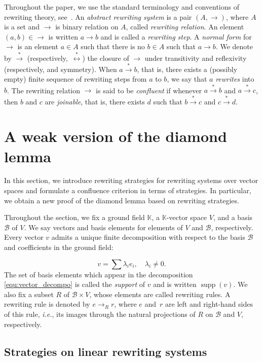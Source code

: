 \documentclass[10pt]{easychair}
\theoremstyle{definition}
\newcommand\ie{\emph{i.e.}}
\DeclareMathOperator{\supp}{supp}
\newcommand\basis{\mathscr{B}}
\newcommand\K{\mathbb{K}}
\newcommand\rewR{\to_R}
\newcommand\rewTrans{\overset{*}{\to}}
\newcommand\rewEquiv{\overset{*}{\leftrightarrow}}
\begin{document}
Throughout the paper, we use the standard terminology and conventions of
rewriting theory, see~\cite{MR1629216}. An {\em abstract rewriting
  system} is a pair $(A,\to)$, where $A$ is a set and $\to$ is binary
relation on $A$, called {\em rewriting relation}. An element
$(a,b)\in\to$ is written $a\to b$ and is called a {\em rewriting step}. A
{\em normal form} for $\to$ is an element $a\in A$ such that there is no
$b\in A$ such that $a\to b$. We denote by $\rewTrans$ 
(respectively,~$\rewEquiv$) the closure of $\to$ under transitivity and
reflexivity (respectively, and symmetry). When $a\rewTrans b$, that is,
there exists a (possibly empty) finite sequence of rewriting steps from
$a$ to  $b$, we say that $a$ {\em rewrites} into $b$. The rewriting
relation $\to$ is said to be {\em confluent} if whenever $a\rewTrans b$
and $a\rewTrans c$, then $b$ and $c$ are {\em joinable}, that is, there
exists $d$ such that $b\rewTrans c$ and $c\rewTrans d$. 


\section{A weak version of the diamond lemma}
\label{sec:a_weak_version_of_the_diamond_lemma}

In this section, we introduce rewriting strategies for rewriting systems
over vector spaces and formulate a confluence criterion in terms of
strategies. In particular, we obtain a new proof of the diamond lemma
based on rewriting strategies.
\medskip

Throughout the section, we fix a ground field $\K$, a $\K$-vector space
$V$, and a basis $\basis$ of $V$. We say vectors and basis elements for
elements of $V$ and $\basis$, respectively. Every vector $v$ admits a
unique finite decomposition with respect to the basis $\basis$ and
coefficients in the ground field:

\begin{equation}\label{equ:vector_decompo}
  v=\sum\lambda_ie_i,\quad\lambda_i\neq 0.
\end{equation}
The set of basis elements which appear in the decomposition
\eqref{equ:vector_decompo} is called the {\it support} of $v$ and is
written $\supp(v)$. We also fix a subset $R$ of $\basis\times V$, whose
elements are called rewriting rules. A rewriting rule is denoted by
$e\rewR r$, where $e$ and~$r$ are left and right-hand sides of this rule,
\ie, its images through the natural projections of $R$ on $\basis$ and
$V$, respectively.

\subsection{Strategies on linear rewriting systems}
\label{sec:strategies_on_linear_rewriting_systems}
\end{document}
